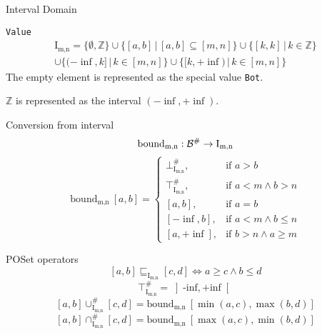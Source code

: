 \documentclass{beamer}
\newcommand{\Intmn}{\textrm{I}_{\textrm{m,n}}}
\newcommand{\bound}{\textrm{bound}_{\textrm{m,n}}}
\begin{document}
\begin{frame}{Interval Domain}

    \begin{overprint}
        \begin{block}{\texttt{Value}}
            \begin{multline*}
                \Intmn = \{ \emptyset, \mathbb{Z} \}
                \cup \{ [a, b]\, |\, [a, b] \subseteq [m, n] \}
                \cup \{ [k, k]\, |\, k \in \mathbb{Z} \} \\
                \cup \{ (-\inf, k]\, |\, k \in [m, n] \}
                \cup \{ [k, +\inf)\, |\, k \in [m, n] \}
            \end{multline*}
            The empty element is represented as the special value \texttt{Bot}.

            $\mathbb{Z}$ is represented as the interval $(-\inf, +\inf)$.
        \end{block}

        \begin{block}{Conversion from interval}
            $$\bound : \cal{B}^\# \to \Intmn $$
            $$
                \bound\ [a,b] =
                \begin{cases}
                    \bot^\#_{\Intmn}, & \mbox{if } a > b                 \\
                    \top^\#_{\Intmn}, & \mbox{if } a < m \wedge b > n    \\
                    [a, b],           & \mbox{if } a = b                 \\
                    [-\inf, b],       & \mbox{if } a < m \wedge b \leq n \\
                    [a, +\inf],       & \mbox{if } b > n \wedge a \geq m
                \end{cases}
            $$
        \end{block}

        \begin{block}{POSet operators}
            $$
                [a,b] \sqsubseteq_{\Intmn} [c,d] \iff a \geq c \wedge b \leq d
            $$
            $$
                \top^\#_{\Intmn} = \left] \textrm{-inf}, \textrm{+inf} \right[
            $$
            $$
                [a,b] \cup^\#_{\Intmn} [c,d] = \bound\ [\min(a,c), \max(b,d)]
            $$
            $$
                [a,b] \cap^\#_{\Intmn} [c,d] = \bound\ [\max(a,c), \min(b,d)]
            $$
        \end{block}


\end{overprint}
\end{frame}
\end{document}
